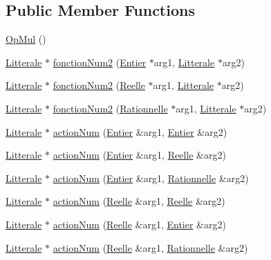 \subsection*{Public Member Functions}
\begin{DoxyCompactItemize}
\item 
\hyperlink{class_op_mul_a1269f54063d9f1966f935ed7f5340f82}{Op\+Mul} ()
\item 
\hyperlink{class_litterale}{Litterale} $\ast$ \hyperlink{class_op_mul_a92b4a0f259e3941c5dfb06baf0bb19eb}{fonction\+Num2} (\hyperlink{class_entier}{Entier} $\ast$arg1, \hyperlink{class_litterale}{Litterale} $\ast$arg2)
\item 
\hyperlink{class_litterale}{Litterale} $\ast$ \hyperlink{class_op_mul_a5334aed41233bfe0e32989a3162cb7f9}{fonction\+Num2} (\hyperlink{class_reelle}{Reelle} $\ast$arg1, \hyperlink{class_litterale}{Litterale} $\ast$arg2)
\item 
\hyperlink{class_litterale}{Litterale} $\ast$ \hyperlink{class_op_mul_a564ab9e0045bb0b9847d30271c62672c}{fonction\+Num2} (\hyperlink{class_rationnelle}{Rationnelle} $\ast$arg1, \hyperlink{class_litterale}{Litterale} $\ast$arg2)
\item 
\hyperlink{class_litterale}{Litterale} $\ast$ \hyperlink{class_op_mul_a583e93c4d996eacd3da73ccbcd5e4214}{action\+Num} (\hyperlink{class_entier}{Entier} \&arg1, \hyperlink{class_entier}{Entier} \&arg2)
\item 
\hyperlink{class_litterale}{Litterale} $\ast$ \hyperlink{class_op_mul_ae62bb21f5fbbaddaae0bea5aa3776ad4}{action\+Num} (\hyperlink{class_entier}{Entier} \&arg1, \hyperlink{class_reelle}{Reelle} \&arg2)
\item 
\hyperlink{class_litterale}{Litterale} $\ast$ \hyperlink{class_op_mul_ae0af76139e245c18a4b506de0e713dde}{action\+Num} (\hyperlink{class_entier}{Entier} \&arg1, \hyperlink{class_rationnelle}{Rationnelle} \&arg2)
\item 
\hyperlink{class_litterale}{Litterale} $\ast$ \hyperlink{class_op_mul_aa6a1c397cd419a0541f09da8581d01a3}{action\+Num} (\hyperlink{class_reelle}{Reelle} \&arg1, \hyperlink{class_reelle}{Reelle} \&arg2)
\item 
\hyperlink{class_litterale}{Litterale} $\ast$ \hyperlink{class_op_mul_a5f0374849c046a0744d8776bbda63a84}{action\+Num} (\hyperlink{class_reelle}{Reelle} \&arg1, \hyperlink{class_entier}{Entier} \&arg2)
\item 
\hyperlink{class_litterale}{Litterale} $\ast$ \hyperlink{class_op_mul_a8d5e27a1010461eeec33ae32546c8fbc}{action\+Num} (\hyperlink{class_reelle}{Reelle} \&arg1, \hyperlink{class_rationnelle}{Rationnelle} \&arg2)

\end{DoxyCompactItemize}
